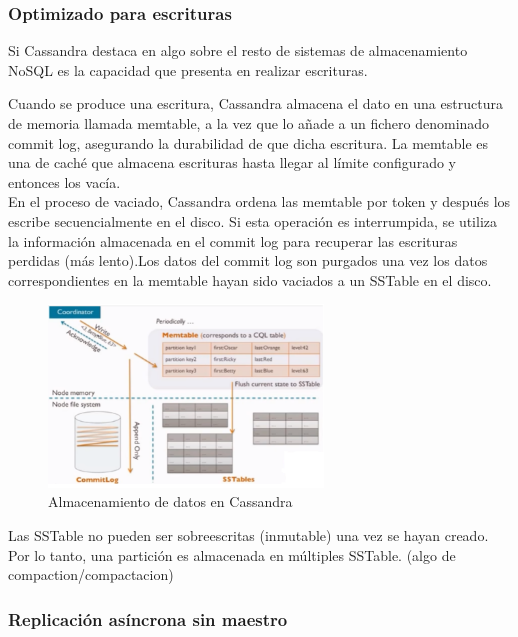 \subsubsection{Optimizado para escrituras}

Si Cassandra destaca en algo sobre el resto de sistemas de almacenamiento NoSQL es la capacidad que presenta en realizar escrituras.

Cuando se produce una escritura, Cassandra almacena el dato en una estructura de memoria llamada memtable, a la vez que lo añade a un fichero denominado commit log, asegurando la durabilidad de que dicha escritura. La memtable es una de caché que almacena escrituras hasta llegar al límite configurado y entonces los vacía.\\

En el proceso de vaciado, Cassandra ordena las memtable por token y después los escribe secuencialmente en el disco. Si esta operación es interrumpida, se utiliza la información almacenada en el commit log para recuperar las escrituras perdidas (más lento).Los datos del commit log son purgados una vez los datos correspondientes en la memtable hayan sido vaciados a un SSTable en el disco.\\

\begin{figure}[h]
	\centering
	\includegraphics[width=0.65\textwidth]{Ilustraciones/cassandra_data_storage.png}
	\caption{Almacenamiento de datos en Cassandra}
	\label{fig:almacenamiento_cassandra}
\end{figure}

Las SSTable no pueden ser sobreescritas (inmutable) una vez se hayan creado. Por lo tanto, una partición es almacenada en múltiples SSTable. (algo de compaction/compactacion)\\

\subsubsection{Replicación asíncrona sin maestro}

